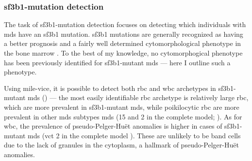 \begin{figure}[!ht]
    \label{fig:wbc-disease-classification-examples}
\end{figure}

\subsubsection{\ac{sf3b1}-mutation detection} 

The task of \ac{sf3b1}-mutation detection focuses on detecting which individuals with \ac{mds} have an \ac{sf3b1} mutation. \Ac{sf3b1} mutations are generally recognized as having a better prognosis and a fairly well determined cytomorphological phenotype in the bone marrow \cite{Malcovati2020-no,Hellstrom_Lindberg2015-zs,Malcovati2015-tz}. To the best of my knowledge, no cytomorphogical phenotype has been previously identified for \ac{sf3b1}-mutant \ac{mds} --- here I outline such a phenotype. 

Using \ac{mile-vice}, it is possible to detect both \ac{rbc} and \ac{wbc} archetypes in \ac{sf3b1}-mutant \ac{mds} () --- the most easily identifiable \ac{rbc} archetype is relatively large \ac{rbc}, which are more prevalent in \ac{sf3b1}-mutant \ac{mds}, while poikilocytic \ac{rbc} are more prevalent in other \ac{mds} subtypes \ac{mds} (15 and 2 in the complete model; ). As for \ac{wbc}, the prevalence of pseudo-Pelger-Huët anomalies is higher in cases of \ac{sf3b1}-mutant \ac{mds} (\ac{vct} 2 in the complete model ). These are unlikely to be band cells due to the lack of granules in the cytoplasm, a hallmark of pseudo-Pelger-Huët anomalies.

\begin{figure}[!ht]
    \label{fig:mile-vice-vcq-so-mds-classification}
\end{figure}

